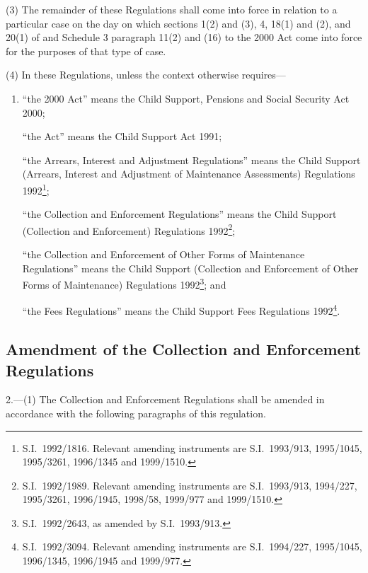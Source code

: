 \documentclass[12pt,a4paper]{article}
\begin{document}
(3) The remainder of these Regulations shall come into force in relation to a particular case on the day on which sections 1(2) and (3), 4, 18(1) and (2), and 20(1) of and Schedule 3 paragraph 11(2) and (16) to the 2000 Act come into force for the purposes of that type of case.

(4) In these Regulations, unless the context otherwise requires—
\begin{enumerate}\item[]
“the 2000 Act” means the Child Support, Pensions and Social Security Act 2000;

“the Act” means the Child Support Act 1991;

“the Arrears, Interest and Adjustment Regulations” means the Child Support (Arrears, Interest and Adjustment of Maintenance Assessments) Regulations 1992\footnote{S.I.\ 1992/1816. Relevant amending instruments are S.I.\ 1993/913, 1995/1045, 1995/3261, 1996/1345 and 1999/1510.};

“the Collection and Enforcement Regulations” means the Child Support (Collection and Enforcement) Regulations 1992\footnote{S.I.\ 1992/1989. Relevant amending instruments are S.I.\ 1993/913, 1994/227, 1995/3261, 1996/1945, 1998/58, 1999/977 and 1999/1510.};

“the Collection and Enforcement of Other Forms of Maintenance Regulations” means the Child Support (Collection and Enforcement of Other Forms of Maintenance) Regulations 1992\footnote{S.I.\ 1992/2643, as amended by S.I.\ 1993/913.}; and

“the Fees Regulations” means the Child Support Fees Regulations 1992\footnote{S.I.\ 1992/3094. Relevant amending instruments are S.I.\ 1994/227, 1995/1045, 1996/1345, 1996/1945 and 1999/977.}.
\end{enumerate}


\subsection[2. Amendment of the Collection and Enforcement Regulations]{Amendment of the Collection and Enforcement Regulations}

2.---(1)  The Collection and Enforcement Regulations shall be amended in accordance with the following paragraphs of this regulation.
\end{document}
